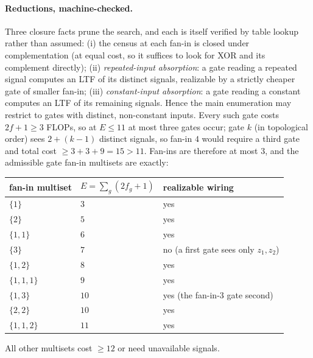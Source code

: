 \documentclass[twocolumn,10pt]{article}
\theoremstyle{definition}
\theoremstyle{remark}
\begin{document}
\paragraph{Reductions, machine-checked.} Three closure facts prune the
search, and each is itself verified by table lookup rather than
assumed: (i) the census at each fan-in is closed under complementation
(at equal cost, so it suffices to look for XOR and its complement
directly); (ii) \emph{repeated-input absorption}: a gate reading a
repeated signal computes an LTF of its distinct signals, realizable by
a strictly cheaper gate of smaller fan-in; (iii) \emph{constant-input
absorption}: a gate reading a constant computes an LTF of its remaining
signals. Hence the main enumeration may restrict to gates with
distinct, non-constant inputs. Every such gate costs $2f + 1 \ge 3$
FLOPs, so at $E \le 11$ at most three gates occur; gate $k$ (in
topological order) sees $2 + (k-1)$ distinct signals, so fan-in $4$
would require a third gate and total cost $\ge 3 + 3 + 9 = 15 > 11$.
Fan-ins are therefore at most $3$, and the admissible gate fan-in
multisets are exactly:

\begin{center}
\footnotesize
\begin{tabular}{lll}
\toprule
fan-in multiset & $E = \sum_g (2 f_g + 1)$ & realizable wiring \\
\midrule
$\{1\}$ & $3$ & yes \\
$\{2\}$ & $5$ & yes \\
$\{1,1\}$ & $6$ & yes \\
$\{3\}$ & $7$ & no (a first gate sees only $z_1, z_2$) \\
$\{1,2\}$ & $8$ & yes \\
$\{1,1,1\}$ & $9$ & yes \\
$\{1,3\}$ & $10$ & yes (the fan-in-$3$ gate second) \\
$\{2,2\}$ & $10$ & yes \\
$\{1,1,2\}$ & $11$ & yes \\
\bottomrule
\end{tabular}
\end{center}

\noindent All other multisets cost $\ge 12$ or need unavailable
signals.
\end{document}
